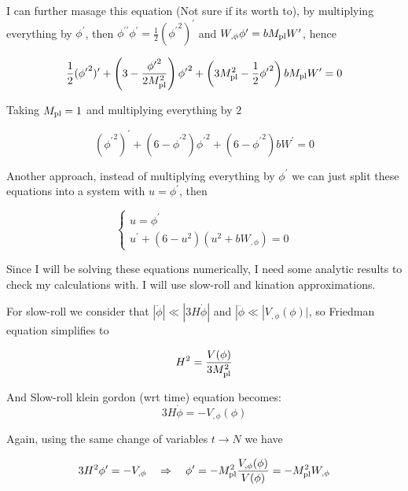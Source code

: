 I can further masage this equation (Not sure if its worth to), by multiplying everything by $\phi^{\prime}$, then $\phi^{\prime \prime} \phi^{\prime} = \frac{1}{2} ({\phi^{\prime}}^{2})^{\prime}$ and $W_{, \phi} \phi^{\prime} = b M_{\rm pl} W^{\prime}$, hence

\begin{equation*}
    \frac{1}{2} ({\phi^{\prime}}^{2})^{\prime} + \left( 3 - \frac{{\phi^{\prime}}^2}{2 M_{\rm pl}^2} \right) {\phi^{\prime}}^2 + \left( 3 M_{\rm pl}^2 - \frac{1}{2} {\phi^{\prime}}^2 \right) b M_{\rm pl} W^{\prime} = 0
\end{equation*}

Taking $M_{\rm pl}=1$ and multiplying everything by $2$

\begin{equation*}
    ({\phi^{\prime}}^{2})^{\prime} + \left( 6 - {\phi^{\prime}}^2 \right) {\phi^{\prime}}^2 + \left( 6 - {\phi^{\prime}}^2 \right) b W^{\prime} = 0
\end{equation*}

Another approach, instead of multiplying everything by $\phi^{\prime}$ we can just split these equations into a system with $u = \phi^{\prime}$, then

\begin{equation*}
\begin{cases*}
    u = \phi^{\prime} \\
    u^{\prime} + ( 6 - u^2)( u^2 + b W_{, \phi} ) = 0
\end{cases*}
\end{equation*}

Since I will be solving these equations numerically, I need some analytic results to check my calculations with. I will use slow-roll and kination approximations.

For slow-roll we consider that $|\ddot{\phi} | \ll |3 H \dot{\phi}|$ and $|\ddot{\phi} \ll |V_{, \phi} (\phi)|$, so Friedman equation simplifies to

\begin{equation*}
    H^2 = \frac{V(\phi)}{3 M_{\rm pl}^2}
\end{equation*}

And Slow-roll klein gordon (wrt time) equation becomes:
\begin{equation*}
    3H \dot{\phi} = - V_{, \phi}(\phi)
\end{equation*}

Again, using the same change of variables $t \rightarrow N$ we have

\begin{equation*}
    3H^2 \phi^{\prime} = - V_{, \phi} \quad \Rightarrow \quad \phi^{\prime} = - M_{\rm pl}^2 \frac{V_{, \phi}(\phi)}{V(\phi)} = - M_{\rm pl}^2 W_{, \phi}
\end{equation*}

